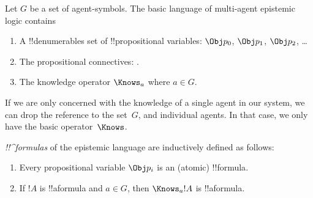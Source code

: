 \documentclass[../../../include/open-logic-section]{subfiles}
\begin{document}


\begin{defn}
Let $G$ be a set of agent-symbols. The basic language of multi-agent epistemic logic contains
\begin{enumerate}
  \item A !!{denumerable}s set of !!{propositional variable}s: $\Obj
    p_0$, $\Obj p_1$, $\Obj p_2$, \dots
  \item The propositional connectives: \startycommalist
  .
  \item The knowledge operator $\Knows_a$ where $a \in G$.
\end{enumerate}
\end{defn}

If we are only concerned with the knowledge of a single agent in our
system, we can drop the reference to the set~$G$, and individual
agents. In that case, we only have the basic operator~$\Knows$.

\begin{defn}
\emph{!!^{formula}s} of the epistemic language are inductively
  defined as follows:
\begin{enumerate}


\item Every propositional variable $\Obj p_i$ is an (atomic) !!{formula}.






\item If $!A$ is !!a{formula} and $a \in G$, then $\Knows_a !A$ is
  !!a{formula}.

\end{enumerate}
\end{defn}
\end{document}

